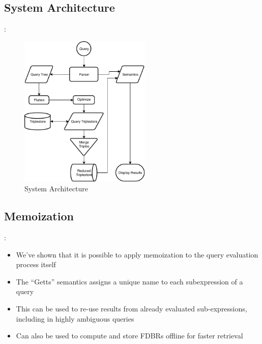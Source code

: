 \documentclass[logoontitle,tabu,supertabular,aspectratio=43]{preney-uwindsor-beamer}
\begin{document}
    \subsection{System Architecture}
    \begin{frame}{\insertsection: \insertsubsection}
        \begin{figure}[h]
            \centering
            \label{fig1}
            \includegraphics[height=7.3cm]{../images/queryprocess.pdf}
            \caption{System Architecture}
        \end{figure}
    \end{frame}

    \subsection{Memoization}
    \begin{frame}{\insertsection: \insertsubsection}
        \begin{itemize}
            \item We've shown that it is possible to apply memoization to the query evaluation process itself
            \item The ``Getts'' semantics assigns a unique name to each subexpression of a query
            \item This can be used to re-use results from already evaluated sub-expressions, including in highly ambiguous queries
            \item Can also be used to compute and store FDBRs offline for faster retrieval
        \end{itemize}
    \end{frame}
\end{document}
